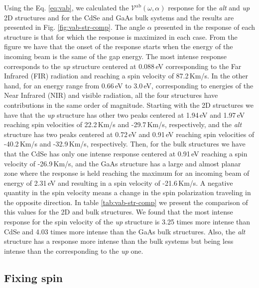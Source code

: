 \documentclass[prb,11pt,tightenlines,twocolumn,aps]{revtex4-1}
\begin{document}
Using the Eq. \eqref{eq:vab}, we calculated the
$\mathcal{V}^{\mathrm{ab}}(\omega,\alpha)$ response for the \emph{alt} and
\emph{up} 2D structures and for the CdSe and GaAs bulk systems and the results
are presented in Fig. \ref{fig:vab-str-comp}. The angle $\alpha$ presented in
the response of each structure is that for which the response is maximized in
each case.
% 
From the figure we have that the onset of the response starts when the energy of
the incoming beam is the same of the gap energy.
% 
The most intense response corresponds to the \emph{up} structure centered at
0.088\,eV corresponding to the Far Infrared (FIR) radiation and reaching a spin
velocity of 87.2\,Km/s.
% 
In the other hand, for an energy range from 0.66\,eV to 3.0\,eV, corresponding
to energies of the Near Infrared (NIR) and visible radiation, all the four
structures have contributions in the same order of magnitude.
% 
Starting with the 2D structures we have that the \emph{up} structure has other
two peaks centered at 1.94\,eV and 1.97\,eV reaching spin velocities of
22.2\,Km/s and -29.7\,Km/s, respectively, and the \emph{alt} structure has two
peaks centered at 0.72\,eV and 0.91\,eV reaching spin velocities of -40.2\,Km/s
and -32.9\,Km/s, respectively.
% 
Then, for the bulk structures we have that the CdSe has only one intense
response centered at 0.91\,eV reaching a spin velocity of -26.9\,Km/s, and the
GaAs structure has a large and almost planar zone where the response is held
reaching the maximum for an incoming beam of energy of 2.31\,eV and resulting in
a spin velocity of -21.6\,Km/s.
% 
A negative quantity in the spin velocity means a change in the spin polarization traveling in the opposite direction.
% 
In table \ref{tab:vab-str-comp} we present the comparison of this values for the
2D and bulk structures. We found that the most intense response for the spin
velocity of the \emph{up} structure is 3.25 times more intense than CdSe and
4.03 times more intense than the GaAs bulk structures. Also, the \emph{alt}
structure has a response more intense than the bulk systems but being less
intense than the corresponding to the \emph{up} one.
% 




\subsection{Fixing spin} %
\label{sec:res-fixspin}
\end{document}
